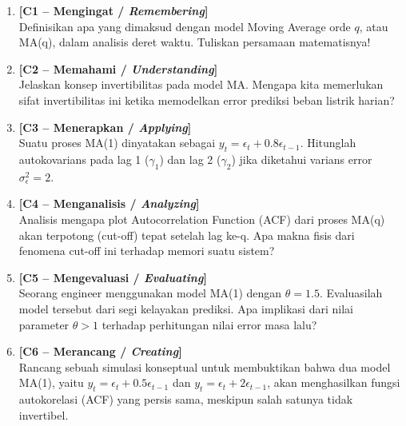\documentclass[11pt,a4paper]{article}
\begin{document}
\begin{enumerate}[leftmargin=1.8em, label=\textbf{Soal \arabic*.}]
    
    \item \textbf{[C1 -- Mengingat / \textit{Remembering}]} \\
    Definisikan apa yang dimaksud dengan model Moving Average orde $q$, atau MA(q), dalam analisis deret waktu. Tuliskan persamaan matematisnya!
    \vspace{2.2cm}

    \item \textbf{[C2 -- Memahami / \textit{Understanding}]} \\
    Jelaskan konsep invertibilitas pada model MA. Mengapa kita memerlukan sifat invertibilitas ini ketika memodelkan error prediksi beban listrik harian?
    \vspace{2.8cm}

    \item \textbf{[C3 -- Menerapkan / \textit{Applying}]} \\
    Suatu proses MA(1) dinyatakan sebagai $y_t = \epsilon_t + 0.8 \epsilon_{t-1}$. Hitunglah autokovarians pada lag 1 ($\gamma_1$) dan lag 2 ($\gamma_2$) jika diketahui varians error $\sigma_\epsilon^2 = 2$.
    \vspace{2.8cm}

    \newpage

    \item \textbf{[C4 -- Menganalisis / \textit{Analyzing}]} \\
    Analisis mengapa plot Autocorrelation Function (ACF) dari proses MA(q) akan terpotong (cut-off) tepat setelah lag ke-q. Apa makna fisis dari fenomena cut-off ini terhadap memori suatu sistem?
    \vspace{3.5cm}

    \item \textbf{[C5 -- Mengevaluasi / \textit{Evaluating}]} \\
    Seorang engineer menggunakan model MA(1) dengan $\theta = 1.5$. Evaluasilah model tersebut dari segi kelayakan prediksi. Apa implikasi dari nilai parameter $\theta > 1$ terhadap perhitungan nilai error masa lalu?
    \vspace{3.5cm}

    \item \textbf{[C6 -- Merancang / \textit{Creating}]} \\
    Rancang sebuah simulasi konseptual untuk membuktikan bahwa dua model MA(1), yaitu $y_t = \epsilon_t + 0.5 \epsilon_{t-1}$ dan $y_t = \epsilon_t + 2 \epsilon_{t-1}$, akan menghasilkan fungsi autokorelasi (ACF) yang persis sama, meskipun salah satunya tidak invertibel.
    \vspace{4.5cm}

\end{enumerate}
\end{document}
